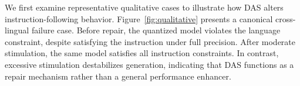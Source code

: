We first examine representative qualitative cases
to illustrate how DAS alters instruction-following behavior.
Figure~\ref{fig:qualitative} presents a canonical cross-lingual failure case.
Before repair, the quantized model violates the language constraint,
despite satisfying the instruction under full precision.
After moderate stimulation,
the same model satisfies all instruction constraints.
In contrast, excessive stimulation destabilizes generation,
indicating that DAS functions as a repair mechanism
rather than a general performance enhancer.


